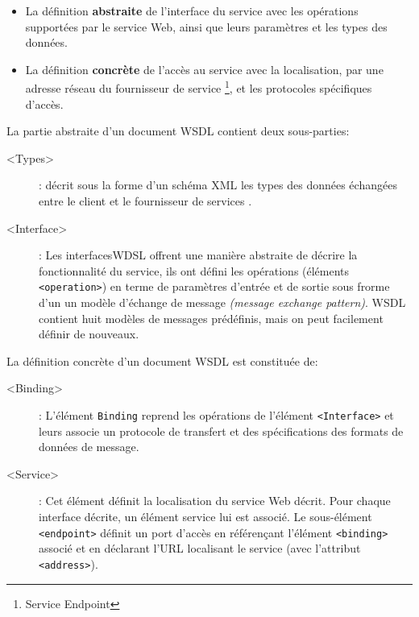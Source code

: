   \SpecialItem
  \begin{itemize}
  \item La définition \textbf{abstraite} de l'interface du service
    avec les opérations supportées par le service Web, ainsi que leurs
    paramètres et les types des données.

  \item La définition \textbf{concrète} de l'accès au service avec la
    localisation, par une adresse réseau du fournisseur de service
    \footnote{Service Endpoint}, et les protocoles spécifiques
    d'accès.
  \end{itemize}

  La partie abstraite d'un document \textsc{WSDL} contient deux
  sous-parties:

  \SpecialItem
  \renewcommand{\descriptionlabel}[1]{\hspace{1.5cm}\texttt{#1}}
  \begin{description}
  \item[<Types>]: décrit sous la forme d'un schéma \textsc{XML} les
    types des données échangées entre le client et le fournisseur de
    services \cite{part20012}.

  \item[<Interface>]: Les interfaces\textsc{WDSL} offrent une manière
    abstraite de décrire la fonctionnalité du service, ils ont défini
    les opérations (éléments \texttt{<operation>}) en terme de
    paramètres d'entrée et de sortie sous frorme d'un un modèle
    d'échange de message \textit{(message exchange
      pattern)}. \textsc{WSDL} contient huit modèles de messages
    prédéfinis, mais on peut facilement définir de nouveaux.
  \end{description}

  La définition concrète d'un document \textsc{WSDL} est constituée
  de:

  \SpecialItem
  \renewcommand{\descriptionlabel}[1]{\hspace{1.5cm}\texttt{#1}}
  \begin{description}
  \item[<Binding>]: L'élément \texttt{Binding} reprend les opérations
    de l'élément \texttt{<Interface>} et leurs associe un protocole de
    transfert et des spécifications des formats de données de message.

  \item[<Service>]: Cet élément définit la localisation du service Web
    décrit. Pour chaque interface décrite, un élément service lui est
    associé. Le sous-élément \texttt{<endpoint>} définit un port
    d’accès en référençant l'élément \texttt{<binding>} associé et en
    déclarant l'\textsc{URL} localisant le service (avec l'attribut
    \texttt{<address>}).
  \end{description}
